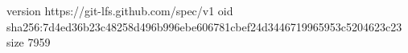 version https://git-lfs.github.com/spec/v1
oid sha256:7d4ed36b23c48258d496b996ebe606781cbef24d3446719965953c5204623c23
size 7959
